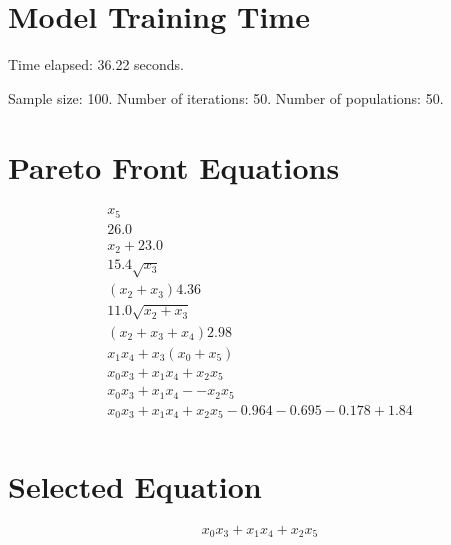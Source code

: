 \documentclass{article}
\begin{document}
\section*{Model Training Time}
Time elapsed: 36.22 seconds.

Sample size: 100.
Number of iterations: 50.
Number of populations: 50.

\section*{Pareto Front Equations}
\begin{align*}
x_{5} \\
26.0 \\
x_{2} + 23.0 \\
15.4 \sqrt{x_{3}} \\
\left(x_{2} + x_{3}\right) 4.36 \\
11.0 \sqrt{x_{2} + x_{3}} \\
\left(x_{2} + x_{3} + x_{4}\right) 2.98 \\
x_{1} x_{4} + x_{3} \left(x_{0} + x_{5}\right) \\
x_{0} x_{3} + x_{1} x_{4} + x_{2} x_{5} \\
x_{0} x_{3} + x_{1} x_{4} - - x_{2} x_{5} \\
x_{0} x_{3} + x_{1} x_{4} + x_{2} x_{5} - 0.964 - 0.695 - 0.178 + 1.84 \\
\end{align*}

\section*{Selected Equation}
\[ x_{0} x_{3} + x_{1} x_{4} + x_{2} x_{5} \]
\end{document}

